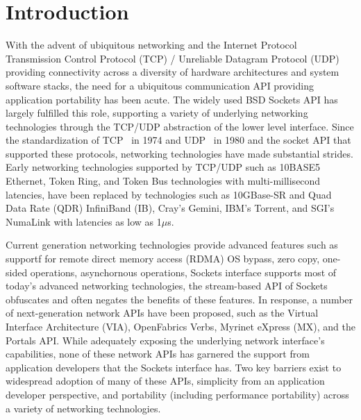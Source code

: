 \section{Introduction}
\label{sec:introduction}


With the advent of ubiquitous networking and the Internet
Protocol~\cite{RFC791} 
Transmission Control Protocol (TCP) / Unreliable Datagram Protocol
(UDP) providing connectivity across a diversity of hardware
architectures and system software stacks, the need for a ubiquitous
communication API providing application portability has been
acute. The widely used BSD Sockets API has largely fulfilled this
role, supporting a variety of underlying networking technologies
through the TCP/UDP abstraction of the lower level interface. Since
the standardization of TCP~\cite{tcp-rfc-675} in 1974 and
UDP~\cite{udp-rfc-768} in 1980 and the socket API that supported these
protocols, networking technologies have made substantial
strides. Early networking technologies supported by TCP/UDP such as
10BASE5 Ethernet, Token Ring, and Token Bus technologies with
multi-millisecond latencies, have been replaced by technologies such
as 10GBase-SR and Quad Data Rate (QDR) InfiniBand (IB), Cray's Gemini,
IBM's Torrent, and SGI's NumaLink with latencies as low as 1$\mu$s.

Current generation networking technologies provide advanced features
such as supportf for remote direct memory access (RDMA) OS bypass,
zero copy, one-sided operations, asynchornous operations,
Sockets interface supports most of today's advanced networking
technologies, 
the stream-based API of Sockets obfuscates and often
negates the benefits of these features. In response, a number of
next-generation network APIs have been proposed, such as the Virtual
Interface Architecture (VIA), OpenFabrics Verbs, Myrinet eXpress (MX),
and the Portals API. While adequately exposing the underlying network
interface's capabilities, none of these network APIs has garnered the
support from application developers that the Sockets interface
has. Two key barriers exist to widespread adoption of many of these
APIs, simplicity from an application developer perspective, and
portability (including performance portability) across a variety of
networking technologies.

